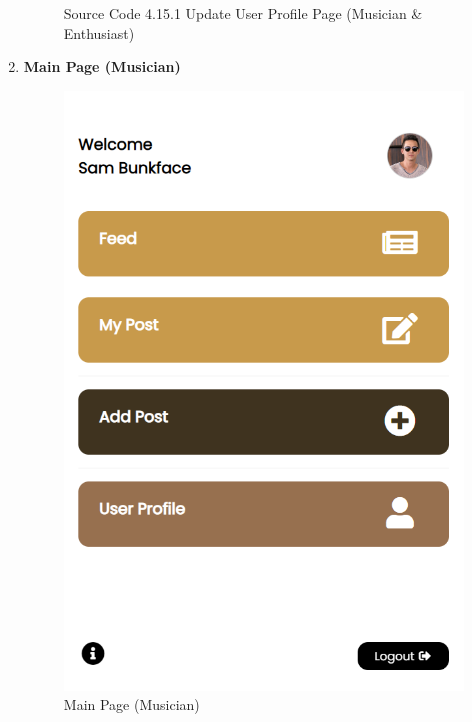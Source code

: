 \begin{enumerate}[1.]
\begin{figure}[h]
\begin{subfigure}[b]{0.7\textwidth}
            \label{fig:sub2}
        \end{subfigure}
        \caption*{Source Code 4.15.1 Update User Profile Page (Musician \& Enthusiast)}
        \label{fig:myfig54a}
    \end{figure}

    \item \textbf{Main Page (Musician)}
    \begin{figure}[h]
        \centering
        \includegraphics[width=0.5\linewidth]{mainmatter/images/frontend/ss/Main Page (Musician).png}
        \caption{Main Page (Musician)}
        \label{fig:myfig55}
    \end{figure}
    \begin{figure}[h]\ContinuedFloat
        \centering
        \begin{subfigure}[b]{0.6\textwidth}
            \centering

\end{subfigure}
\end{figure}
\end{enumerate}
